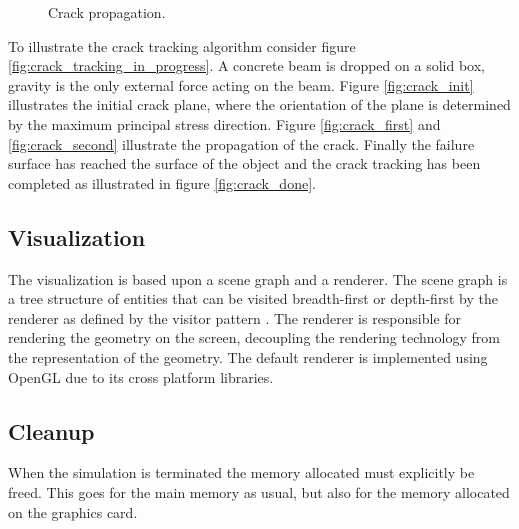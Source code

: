 \begin{figure}
\begin{minipage}[b]{0.5\linewidth}
    \centering
  \end{minipage}
  \caption{Crack propagation.}
  \label{fig:crack_tracking_in_progress}
\end{figure}

To illustrate the crack tracking algorithm consider figure
\vref{fig:crack_tracking_in_progress}. A concrete beam is
dropped on a solid box, gravity is the only external force
acting on the beam. Figure \vref{fig:crack_init} illustrates the
initial crack plane, where the orientation of the
plane is determined by the maximum principal stress direction.
%
Figure \ref{fig:crack_first} and \vref{fig:crack_second} illustrate
the propagation of the crack. Finally the failure surface has reached
the surface
of the object and the crack tracking has been completed as illustrated
in figure \vref{fig:crack_done}. 

\subsection*{Visualization}
The visualization is based
upon a scene graph and a renderer. The scene graph is a tree structure
of entities that can be visited breadth-first or depth-first by the
renderer as defined by the visitor pattern
. The renderer is responsible for rendering 
the geometry on the screen, decoupling the rendering technology from
the representation of the geometry. The default renderer is
implemented using OpenGL due to its
cross platform libraries. 



\subsection*{Cleanup}
When the simulation is terminated the memory allocated must explicitly
be freed. This goes for the main memory as usual, but also for the
memory allocated on the graphics card. 

